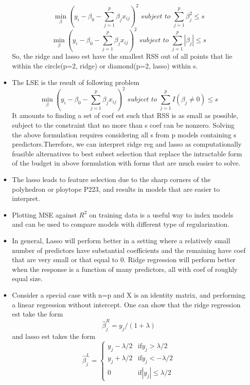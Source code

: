 \documentclass[a4paper, 12pt]{article}
\begin{document}
\begin{itemize}
    \[	 \displaystyle{\min_{\beta}} (y_i-\beta_0-\sum_{j=1}^{p}\beta_jx_{ij})^2 \textit{   subject to  } \sum_{j=1}^{p}\beta_j^2 \le s
    \]
     \[	 \displaystyle{\min_{\beta}} (y_i-\beta_0-\sum_{j=1}^{p}\beta_jx_{ij})^2 \textit{   subject to  } \sum_{j=1}^{p}|\beta_j| \le s
    \]
    So, the ridge and lasso est have the smallest RSS out of all points that lie within the circle(p=2, ridge) or diamond(p=2, lasso) within s.
    \item The LSE is the result of following problem
    \[ \displaystyle{\min_{\beta}} (y_i-\beta_0-\sum_{j=1}^{p}\beta_jx_{ij})^2 \textit{   subject to  } \sum_{j=1}^{p}I(\beta_j \ne 0) \le s
    \]
   It amounts to finding a set of coef est such that RSS is as small as possible, subject to the constraint that no more than s coef can be nonzero. Solving the above formulation requires considering all s from p models containing s predictors.Therefore, we can interpret ridge reg and lasso as computationally feasible alternatives to best subset selection that replace the intractable form of the budget in above formulation with forms that are much easier to solve.
   \item The lasso leads to feature selection due to the sharp corners of the polyhedron or ploytope P223, and results in models that are easier to interpret.
   \item Plotting MSE against $R^2$ on training data is a useful way to index models and can be used to compare models with different type of regularization.
   \item In general, Lasso will perform better in a setting where a relatively small number of predictors have substantial coefficients and the remaining have coef that are very small or that equal to 0. Ridge regression will perform better when the response is a function of many predictors, all with coef of roughly equal size. 
   \item Consider a special case with n=p and X is an identity matrix, and performing a linear regression without intercept. One can show that the ridge regression est take the form 
   \[ \hat{\beta}^R_j=y_j/(1+\lambda)
   \]
   and lasso est takes the form
	\begin{equation}
	\hat{\beta}^L_j =
	\begin{cases}
	y_j-\lambda/2 & \text{if} y_j > \lambda/2 \\
	y_j+\lambda/2 & \text{if} y_j < -\lambda/2 \\
	0 & \text{if} |y_j|\le \lambda/2
	\end{cases}
	\end{equation}

\end{itemize}
\end{document}
